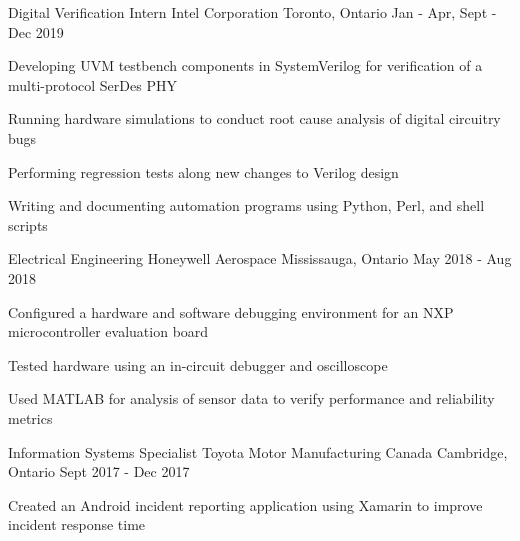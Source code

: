 

\begin{cventries}

  \cventry
    {Digital Verification Intern} %
    {Intel Corporation} %
    {Toronto, Ontario} %
    {Jan - Apr, Sept - Dec 2019} %
    {
      \begin{cvitems} %
        \item {Developing UVM testbench components in SystemVerilog for verification of a multi-protocol SerDes PHY}
        \item {Running hardware simulations to conduct root cause analysis of digital circuitry bugs}
        \item {Performing regression tests along new changes to Verilog design}
        \item {Writing and documenting automation programs using Python, Perl, and shell scripts}
      \end{cvitems}
    }

  \cventry
    {Electrical Engineering} %
    {Honeywell Aerospace} %
    {Mississauga, Ontario} %
    {May 2018 - Aug 2018} %
    {
      \begin{cvitems} %
        \item {Configured a hardware and software debugging environment for an NXP microcontroller evaluation board}
        \item {Tested hardware using an in-circuit debugger and oscilloscope}
        \item {Used MATLAB for analysis of sensor data to verify performance and reliability metrics}
      \end{cvitems}
    }

  \cventry
    {Information Systems Specialist} %
    {Toyota Motor Manufacturing Canada} %
    {Cambridge, Ontario} %
    {Sept 2017 - Dec 2017} %
    {
      \begin{cvitems} %
        \item {Created an Android incident reporting application using Xamarin to improve incident response time}
      \end{cvitems}
    }


\end{cventries}
